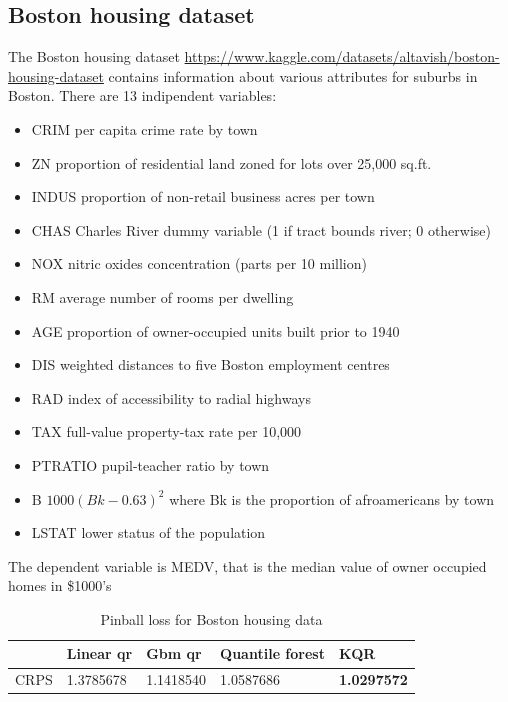 \subsection{Boston housing dataset}
The Boston housing dataset \href{https://www.kaggle.com/datasets/altavish/boston-housing-dataset}{https://www.kaggle.com/datasets/altavish/boston-housing-dataset} contains information about various attributes for suburbs in Boston.
There are 13 indipendent variables:
\begin{itemize}
\item CRIM per capita crime rate by town
\item ZN proportion of residential land zoned for lots over 25,000 sq.ft.\
\item INDUS proportion of non-retail business acres per town
\item CHAS Charles River dummy variable (1 if tract bounds river; 0 otherwise)
\item NOX nitric oxides concentration (parts per 10 million)
\item RM average number of rooms per dwelling
\item AGE proportion of owner-occupied units built prior to 1940
\item DIS weighted distances to five Boston employment centres
\item RAD index of accessibility to radial highways
\item TAX full-value property-tax rate per 10,000
\item PTRATIO pupil-teacher ratio by town
\item B $1000(Bk - 0.63)^2$ where Bk is the proportion of afroamericans by town
\item LSTAT lower status of the population
\end{itemize}
The dependent variable is MEDV, that is the median value of owner occupied homes in \$1000's

\begin{table}
\caption{Pinball loss for Boston housing data}
\begin{tabular}{lllll}
\toprule
    & Linear qr & Gbm qr & Quantile forest & KQR \\
\midrule
CRPS & 1.3785678 & 1.1418540 & 1.0587686 & \textbf{1.0297572} \\
\bottomrule
\end{tabular}
\end{table}

